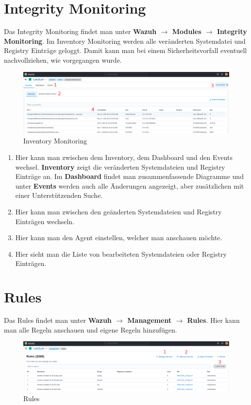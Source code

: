 \section{Integrity Monitoring}
Das Integrity Monitoring findet man unter \textbf{Wazuh $\rightarrow$ Modules $\rightarrow$ Integrity Monitoring}.
Im Inventory Monitoring werden alle veränderten Systemdatei und Registry Einträge geloggt. 
Damit kann man bei einem Sicherheitsvorfall eventuell nachvollziehen, wie vorgegangen wurde.

\begin{figure}[H]
    \centering
    \includegraphics[width=\linewidth]{../img/wazuh-im-inventory.png}
    \caption{Inventory Monitoring}
\end{figure}

\begin{enumerate}
    \item Hier kann man zwischen dem Inventory, dem Dashboard und den Events wechsel.
    \textbf{Inventory} zeigt die veränderten Systemdateien und Registry Einträge an. Im \textbf{Dashboard} findet man zusammenfassende Diagramme und unter \textbf{Events} werden auch alle Änderungen angezeigt, aber zusätzlichen mit einer Unterstützenden Suche. 
    \item Hier kann man zwischen den geänderten Systemdateien und Registry Einträgen wechseln.
    \item Hier kann man den Agent einstellen, welcher man anschauen möchte.
    \item Hier sieht man die Liste von bearbeiteten Systemdateien oder Registry Einträgen.
\end{enumerate}

\section{Rules}
Das Rules findet man unter \textbf{Wazuh $\rightarrow$ Management $\rightarrow$ Rules}.
Hier kann man alle Regeln anschauen und eigene Regeln hinzufügen. 

\begin{figure}[H]
    \centering
    \includegraphics[width=\linewidth]{../img/wazuh-rules.png}
    \caption{Rules}
\end{figure}

